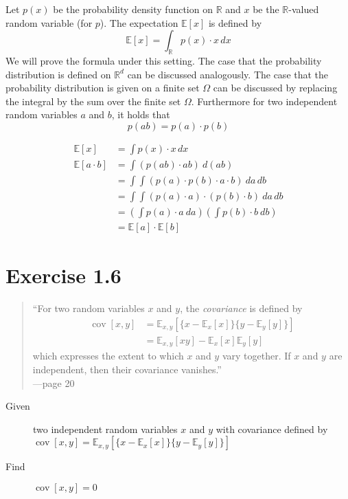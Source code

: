 \documentclass[a4paper]{article}
\newcommand\E{\mathbb{E}}
\DeclareMathOperator\cov{cov}
\begin{document}
Let $p(x)$ be the probability density function on $\mathbb{R}$
and $x$ be the $\mathbb{R}$-valued random variable (for $p$).
The expectation $\E[x]$ is defined by
\[ \E[x] = \int_{\mathbb R} p(x) \cdot x \, dx \]
We will prove the formula under this setting.
The case that the probability distribution is defined on ${\mathbb R}^d$
can be discussed analogously. The case that the probability distribution
is given on a finite set $\Omega$ can be discussed by replacing the
integral by the sum over the finite set $\Omega$.
Furthermore for two independent random variables $a$ and $b$, it holds that
\[ p(ab) = p(a) \cdot p(b) \]

\begin{align*}
  \E[x] &= \int p(x) \cdot x \, dx \\
  \E[a \cdot b]
    &= \int \left( p(ab) \cdot ab \right) \: d(ab) \\
    &= \int \int \left( p(a) \cdot p(b) \cdot a \cdot b \right)   \: da \, db \\
    &= \int \int \left( p(a) \cdot a \right)  \cdot \left(p(b) \cdot b\right)  \: da \, db \\
    &= \left(\int p(a) \cdot a \: da\right) \left(\int p(b) \cdot b  \: db\right) \\
    &= \E[a] \cdot \E[b]
\end{align*}

\section{Exercise 1.6}

\begin{quote}
  \enquote{For two random variables $x$ and $y$, the \emph{covariance} is defined by
  \begin{align*}
    \cov{[x,y]} &= \E_{x,y}[\{x - \E_{x}[x]\}\{y - \E_{y}[y]\}] \\
                &= \E_{x,y}[xy] - \E_{x}[x] \E_{y}[y]
  \end{align*}
  which expresses the extent to which $x$ and $y$ vary together.
  If $x$ and $y$ are independent, then their covariance vanishes.} \\
  ---page 20
\end{quote}

\begin{description}
  \item[Given] two independent random variables $x$ and $y$ with covariance defined by $\cov[x,y] = \E_{x,y}[\{x - \E_{x}[x]\}\{y - \E_{y}[y]\}]$
  \item[Find] $\cov[x,y] = 0$
\end{description}
\end{document}
